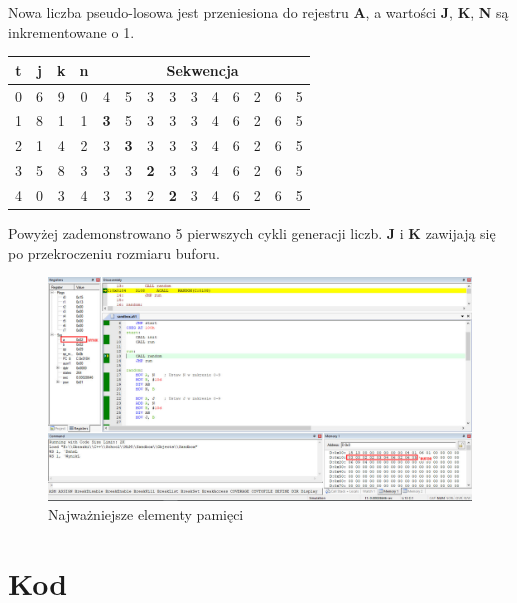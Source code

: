 \documentclass{article}
\begin{document}
Nowa liczba pseudo-losowa jest przeniesiona do rejestru \textbf{A}, a wartości \textbf{J}, \textbf{K}, \textbf{N} są inkrementowane o 1.

\begin{center}
\begin{tabular}{ |c|c|c|c|c|c|c|c|c|c|c|c|c|c| } 
 \hline
	t & j & k & n & \multicolumn{10}{|c|}{Sekwencja} \\
 \hline
	0 & 6 & 9 & 0 & 4 & 5 & 3 & 3 & 3 & 4 & 6 & 2 & 6 & 5 \\ 
 \hline
	1 & 8 & 1 & 1 & \textbf{3} & 5 & 3 & 3 & 3 & 4 & 6 & 2 & 6 & 5 \\ 
 \hline
	2& 1 & 4 & 2  & 3 & \textbf{3} & 3 & 3 & 3 & 4 & 6 & 2 & 6 & 5 \\ 
 \hline
	3 & 5 & 8 & 3 & 3 & 3 & \textbf{2} & 3 & 3 & 4 & 6 & 2 & 6 & 5 \\ 
 \hline
	4 & 0 & 3 & 4 & 3 & 3 & 2 & \textbf{2} & 3 & 4 & 6 & 2 & 6 & 5 \\ 
 \hline
\end{tabular}
\end{center}

Powyżej zademonstrowano 5 pierwszych cykli generacji liczb. \textbf{J} i \textbf{K} zawijają się po przekroczeniu rozmiaru buforu.

\begin{figure}
  \includegraphics[width=\linewidth]{Fig1.jpg}
  \caption{Najważniejsze elementy pamięci}
  \label{fig:fig1}
\end{figure}


\section{Kod}
\end{document}
